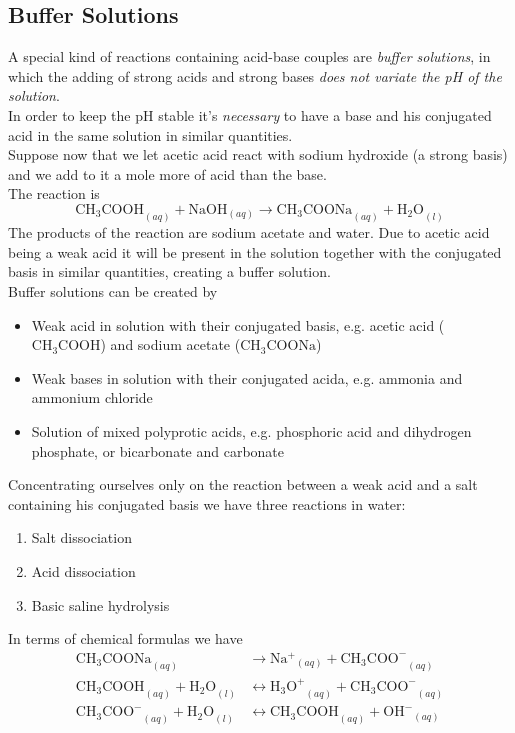 \documentclass[../qm.tex]{subfiles}
\begin{document}
\subsection{Buffer Solutions}
A special kind of reactions containing acid-base couples are \emph{buffer solutions}, in which the adding of strong acids and strong bases \textit{does not variate the pH of the solution}.\\
In order to keep the pH stable it's \textit{necessary} to have a base and his conjugated acid in the same solution in similar quantities.\\
Suppose now that we let acetic acid react with sodium hydroxide (a strong basis) and we add to it a mole more of acid than the base.\\
The reaction is
\begin{equation}
	\mathrm{CH_3COOH}_{(aq)}+\mathrm{NaOH}_{(aq)}\to\mathrm{CH_3COONa}_{(aq)}+\mathrm{H_2O}_{(l)}
	\label{eq:ch3coona.chem}
\end{equation}
The products of the reaction are sodium acetate and water. Due to acetic acid being a weak acid it will be present in the solution together with the conjugated basis in similar quantities, creating a buffer solution.\\
Buffer solutions can be created by
\begin{itemize}
\item Weak acid in solution with their conjugated basis, e.g. acetic acid ($\mathrm{CH_3COOH}$) and sodium acetate ($\mathrm{CH_3COONa}$)
\item Weak bases in solution with their conjugated acida, e.g. ammonia and ammonium chloride
\item Solution of mixed polyprotic acids, e.g. phosphoric acid and dihydrogen phosphate, or bicarbonate and carbonate
\end{itemize}
Concentrating ourselves only on the reaction between a weak acid and a salt containing his conjugated basis we have three reactions in water:
\begin{enumerate}
\item Salt dissociation
\item Acid dissociation
\item Basic saline hydrolysis
\end{enumerate}
In terms of chemical formulas we have
\begin{equation}
	\begin{aligned}
		\mathrm{CH_3COONa}_{(aq)}&\to\mathrm{Na^+}_{(aq)}+\mathrm{CH_3COO^-}_{(aq)}\\
		\mathrm{CH_3COOH}_{(aq)}+\mathrm{H_2O}_{(l)}&\longleftrightarrow\mathrm{H_3O^+}_{(aq)}+\mathrm{CH_3COO^-}_{(aq)}\\
		\mathrm{CH_3COO^-}_{(aq)}+\mathrm{H_2O}_{(l)}&\longleftrightarrow\mathrm{CH_3COOH}_{(aq)}+\mathrm{OH^-}_{(aq)}
	\end{aligned}
	\label{eq:ch3coohbuffer.chem}
\end{equation}
\end{document}
